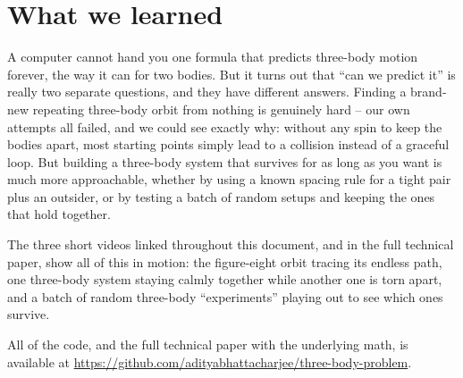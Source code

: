 \documentclass[11pt]{article}
\begin{document}
\section{What we learned}

A computer cannot hand you one formula that predicts three-body motion
forever, the way it can for two bodies. But it turns out that ``can we
predict it'' is really two separate questions, and they have different
answers. Finding a brand-new repeating three-body orbit from nothing is
genuinely hard -- our own attempts all failed, and we could see exactly
why: without any spin to keep the bodies apart, most starting points
simply lead to a collision instead of a graceful loop. But building a
three-body system that survives for as long as you want is much more
approachable, whether by using a known spacing rule for a tight pair plus
an outsider, or by testing a batch of random setups and keeping the ones
that hold together.

The three short videos linked throughout this document, and in the full
technical paper, show all of this in motion: the figure-eight orbit
tracing its endless path, one three-body system staying calmly together
while another one is torn apart, and a batch of random three-body
``experiments'' playing out to see which ones survive.

All of the code, and the full technical paper with the underlying math,
is available at
\url{https://github.com/adityabhattacharjee/three-body-problem}.
\end{document}
